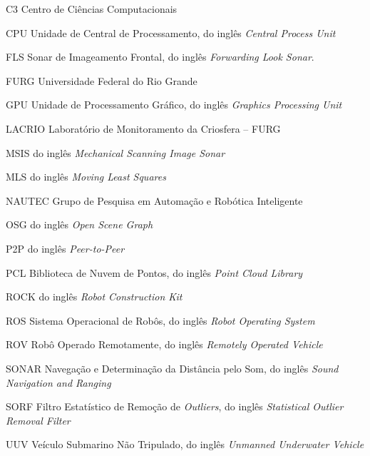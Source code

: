 
\begin{siglas}
    \item[C3] Centro de Ciências Computacionais
    \item[CPU] Unidade de Central de Processamento, do inglês \textit{Central Process Unit}
    \item[FLS] Sonar de Imageamento Frontal, do inglês \textit{Forwarding Look Sonar}.
    \item[FURG] Universidade Federal do Rio Grande
    \item[GPU] Unidade de Processamento Gráfico, do inglês \textit{Graphics Processing Unit}
    \item[LACRIO] Laboratório de Monitoramento da Criosfera -- FURG
    \item[MSIS] do inglês \textit{Mechanical Scanning Image Sonar}
    \item[MLS] do inglês \textit{Moving Least Squares}
    \item[NAUTEC] Grupo de Pesquisa em Automação e Robótica Inteligente
    \item[OSG] do inglês \textit{Open Scene Graph}
    \item[P2P] do inglês \textit{Peer-to-Peer}
    \item[PCL] Biblioteca de Nuvem de Pontos, do inglês \textit{Point Cloud Library}
    \item[ROCK] do inglês \textit{Robot Construction Kit}
    \item[ROS] Sistema Operacional de Robôs, do inglês \textit{Robot Operating System}
    \item[ROV] Robô Operado Remotamente, do inglês \textit{Remotely Operated Vehicle}
    \item[SONAR] Navegação e Determinação da Distância pelo Som, do inglês \textit{Sound Navigation and Ranging}
    \item[SORF] Filtro Estatístico de Remoção de \textit{Outliers}, do inglês \textit{Statistical Outlier Removal Filter}
    \item[UUV] Veículo Submarino Não Tripulado, do inglês \textit{Unmanned Underwater Vehicle}
\end{siglas}



